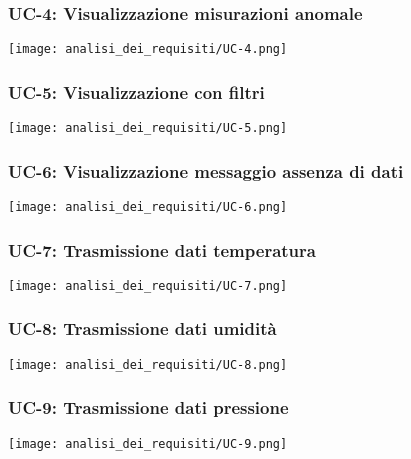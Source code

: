 \subsubsection{UC-4: Visualizzazione misurazioni anomale}
\begin{center}
	\texttt{[image: analisi\_dei\_requisiti/UC-4.png]}
\end{center}

\subsubsection{UC-5: Visualizzazione con filtri}
\begin{center}
	\texttt{[image: analisi\_dei\_requisiti/UC-5.png]}
\end{center}

\subsubsection{UC-6: Visualizzazione messaggio assenza di dati}
\begin{center}
	\texttt{[image: analisi\_dei\_requisiti/UC-6.png]}
\end{center}

\subsubsection{UC-7: Trasmissione dati temperatura}
\begin{center}
	\texttt{[image: analisi\_dei\_requisiti/UC-7.png]}
\end{center}

\subsubsection{UC-8: Trasmissione dati umidità}
\begin{center}
	\texttt{[image: analisi\_dei\_requisiti/UC-8.png]}
\end{center}

\subsubsection{UC-9: Trasmissione dati pressione}
\begin{center}
	\texttt{[image: analisi\_dei\_requisiti/UC-9.png]}
\end{center}

